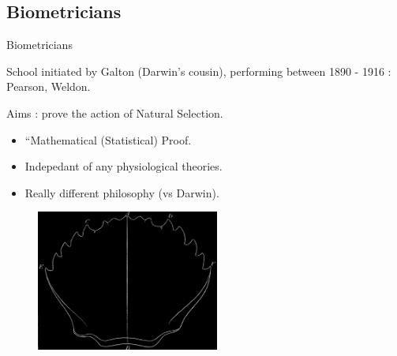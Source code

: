 \documentclass[8pt]{beamer}
\begin{document}
\subsection{Biometricians}
\begin{frame}{Biometricians}
	
	School initiated by Galton (Darwin's cousin), performing between 1890 - 1916 : Pearson, Weldon.
\vfil

Aims : prove the action of Natural Selection.
	\begin{itemize}
		\item ``Mathematical (Statistical) Proof.
		\item  Indepedant of any physiological theories. 
		\item  Really different philosophy (vs Darwin).
	\end{itemize}
	\begin{figure}[h]
		\begin{center}
			\includegraphics[width=6cm]{images/crabe.png}
		\end{center}
		\label{fig:crabe}
	\end{figure}
\end{frame}
\end{document}

